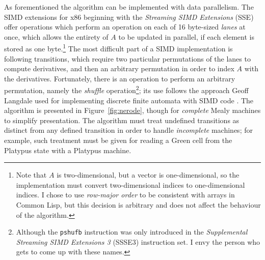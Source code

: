 As forementioned the algorithm can be implemented with data parallelism.
The SIMD extensions for x86 beginning with the \emph{Streaming SIMD Extensions} (SSE)
offer operations which perform an operation on each of 16 byte-sized \emph{lanes}
at once, which allows the entirety of $A$ to be updated in parallel, if each
element is stored as one byte.\footnote{Note that $A$ is two-dimensional, but
  a vector is one-dimensional, so the implementation must convert
  two-dimensional indices to one-dimensional indices. I chose to use
  \emph{row-major order} to be consistent with arrays in Common Lisp, but
  this decision is arbitrary and does not affect the behaviour of the algorithm.}
The most difficult part of a SIMD implementation
is following transitions, which require two particular permutations of the lanes
to compute derivatives, and then an arbitrary permutation in order to index $A$
with the derivatives. Fortunately, there is an operation to perform an arbitrary
permutation, namely the \emph{shuffle} operation\footnote{Although the \texttt{pshufb}
  instruction was only introduced in the \emph{Supplemental Streaming SIMD
    Extensions 3} (SSSE3) instruction set. I envy the person who gets to come up with
  these names.};
its use follows the approach Geoff Langdale used for implementing discrete finite
automata with SIMD code \cite{sheng,hyperscan}. The algorithm is presented in
Figure~\ref{fig:nerode}, though for \emph{complete} Mealy machines to simplify
presentation. The algorithm must treat undefined transitions as distinct from
any defined transition in order to handle \emph{incomplete} machines; for
example, such treatment must be given for reading a Green cell from the Platypus
state with a Platypus machine.

